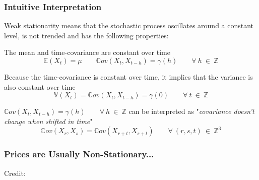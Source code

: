 \documentclass{beamer}
\newenvironment{wideenumerate}{\enumerate\addtolength{\itemsep}{10pt}}{\endenumerate}
\begin{document}
\begin{frame}
  \frametitle{Intuitive Interpretation}
   Weak stationarity means that the stochastic process oscillates around a constant level, is not trended and has the following properties:\\
  
  \begin{wideenumerate}
  \item The mean and time-covariance are constant over time
    \begin{equation*}
\mathbb{E}(X_t) = \mu \qquad \mathbb{C}ov(X_t, X_{t-h}) = \gamma(h) \qquad \forall \ h \ \in \ \mathbb{Z}
\end{equation*}
\item Because the time-covariance is constant over time, it implies that the variance is also constant over time
  \begin{equation*}
\mathbb{V}(X_t) = \mathbb{C}ov(X_t, X_{t-h}) = \gamma(0) \qquad \forall \ t \ \in \ \mathbb{Z}
  \end{equation*}
\item $\mathbb{C}ov(X_t, X_{t-h}) = \gamma(h) \qquad \forall \ h \ \in \ \mathbb{Z}$ can be interpreted as "\emph{covariance doesn't change when shifted in time}"
  \begin{equation*}
\mathbb{C}ov(X_r, X_s) = \mathbb{C}ov(X_{r+t}, X_{s+t}) \qquad \forall \ (r, s, t) \ \in \ \mathbb{Z}^3
  \end{equation*}
  
  \end{wideenumerate}
\end{frame}


\begin{frame}
\frametitle{Prices are Usually Non-Stationary...}
\hspace*{15pt}\hbox{\scriptsize Credit:}
\end{frame}
\end{document}
